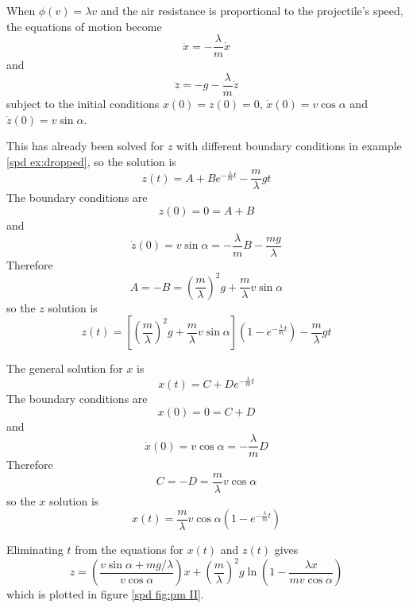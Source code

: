 \begin{example}
\label{spd ex:prop sp}

When $\phi(v)=\lambda v$ and the air resistance is proportional to the
projectile's speed, the equations of motion become
$$\ddot{x}=-\frac{\lambda}{m}\dot{x}$$
and
$$\ddot{z}=-g-\frac{\lambda}{m}\dot{z}$$
subject to the initial conditions $x(0)=z(0)=0$, $\dot{x}(0)=v\cos\alpha$ 
and $\dot{z}(0)=v\sin\alpha$.

This has already been solved for $z$ with different boundary conditions
in example \ref{spd ex:dropped}, so the solution is
$$z(t)=A+Be^{-\frac{\lambda}{m}t}-\frac{m}{\lambda}gt$$
The boundary conditions are
$$z(0)=0=A+B$$
and
$$\dot{z}(0)=v\sin\alpha=-\frac{\lambda}{m}B-\frac{mg}{\lambda}$$
Therefore
$$A=-B=\left(\frac{m}{\lambda}\right)^2g+\frac{m}{\lambda}v\sin\alpha$$
so the $z$ solution is
$$z(t)=\left[\left(\frac{m}{\lambda}\right)^2g+\frac{m}{\lambda}v\sin\alpha
\right]\left(1-e^{-\frac{\lambda}{m}t}\right)-\frac{m}{\lambda}gt$$

The general solution for $x$ is
$$x(t)=C+De^{-\frac{\lambda}{m}t}$$
The boundary conditions are
$$x(0)=0=C+D$$ 
and
$$\dot{x}(0)=v\cos\alpha=-\frac{\lambda}{m}D$$
Therefore
$$C=-D=\frac{m}{\lambda}v\cos\alpha$$
so the $x$ solution is
$$x(t)=\frac{m}{\lambda}v\cos\alpha\left(1-e^{-\frac{\lambda}{m}t}\right)$$

Eliminating $t$ from the equations for $x(t)$ and $z(t)$ gives
$$z=\left(\frac{v\sin\alpha+mg/\lambda}{v\cos\alpha}\right)x
+\left(\frac{m}{\lambda}\right)^2g
\ln\left(1-\frac{\lambda x}{mv\cos\alpha}\right)$$
which is plotted in figure \ref{spd fig:pm II}.
\end{example}

